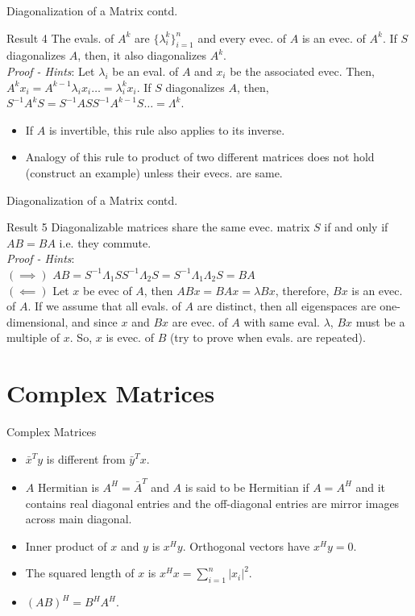 \documentclass{beamer}
\begin{document}
\begin{frame}{Diagonalization of a Matrix contd.}
\begin{block}{Result 4}
The evals. of $A^k$ are $\{\lambda_{i}^k\}_{i=1}^{n}$ and every evec. of $A$ is an evec. of $A^k$. If $S$ diagonalizes $A$, then, it also diagonalizes $A^k$.\\
\textit{Proof - Hints}: Let $\lambda_i$ be an eval. of $A$ and $x_i$ be the associated evec. Then, $A^kx_i = A^{k-1}\lambda_ix_i \ldots = \lambda_i^kx_i$. If $S$ diagonalizes $A$, then, $S^{-1}A^{k}S = S^{-1}ASS^{-1}A^{k-1}S \ldots = \Lambda^k$.
\begin{itemize}
    \item If $A$ is invertible, this rule also applies to its inverse.
    \item Analogy of this rule to product of two different matrices does not hold (construct an example) unless their evecs. are same.
\end{itemize}
\end{block}
\end{frame}

\begin{frame}{Diagonalization of a Matrix contd.}
\begin{block}{Result 5}
Diagonalizable matrices share the same evec. matrix $S$ if and only if $AB=BA$ i.e. they commute.\\
\textit{Proof - Hints}:\\
$(\implies)$ $AB = S^{-1}\Lambda_1SS^{-1}\Lambda_2S = S^{-1}\Lambda_1\Lambda_2S = BA$\\
$(\impliedby)$ Let $x$ be evec of $A$, then $ABx = BAx = \lambda Bx$, therefore, $Bx$ is an evec. of $A$. If we assume that all evals. of $A$ are distinct, then all eigenspaces are one-dimensional, and since $x$ and $Bx$ are evec. of $A$ with same eval. $\lambda$, $Bx$ must be a multiple of $x$. So, $x$ is evec. of $B$ (try to prove when evals. are repeated).
\end{block}
\end{frame}

\section{Complex Matrices}
\begin{frame}{Complex Matrices}
\begin{itemize}
    \item $\bar{x}^{T}y$ is different from $\bar{y}^Tx$.
    \item $A$ Hermitian is $A^{H} = \bar{A}^T$ and $A$ is said to be Hermitian if $A = A^{H}$ and it contains real diagonal entries and the off-diagonal entries are mirror images across main diagonal.
    \item Inner product of $x$ and $y$ is $x^Hy$. Orthogonal vectors have $x^{H}y = 0$.
    \item The squared length of $x$ is $x^Hx = \sum_{i=1}^{n}|x_i|^2$.
    \item $(AB)^H = B^HA^H$.
\end{itemize}
\end{frame}
\end{document}
